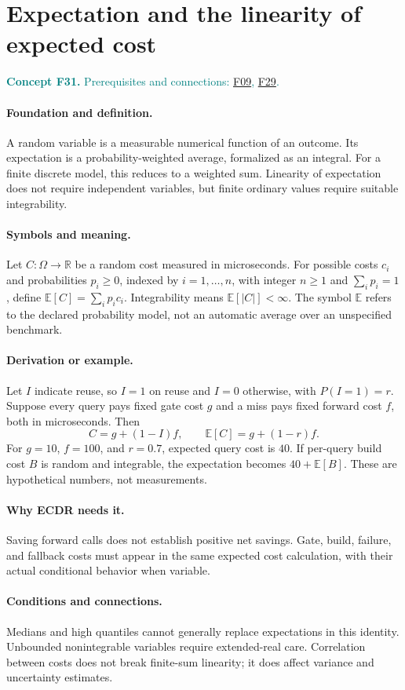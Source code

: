 \documentclass[11pt,a4paper]{article}
\newcommand{\R}{\mathbb R}
\newcommand{\E}{\mathbb E}
\newcommand{\conceptid}{Front matter}
\newcommand{\concept}[3]{\clearpage\renewcommand{\conceptid}{#1}%
\section{#2}\label{concept:#1}%
\textcolor{teal}{\textbf{Concept #1.} Prerequisites and connections: #3.}\par
\typeout{ECDR-CONCEPT-START #1 PAGE=\thepage}}
\begin{document}
\concept{F31}{Expectation and the linearity of expected cost}{\hyperref[concept:F09]{F09}, \hyperref[concept:F29]{F29}}
\paragraph{Foundation and definition.}
A random variable is a measurable numerical function of an outcome.
Its expectation is a probability-weighted average, formalized as an
integral. For a finite discrete model, this reduces to a weighted sum.
Linearity of expectation does not require independent variables, but
finite ordinary values require suitable integrability.
\paragraph{Symbols and meaning.}
Let $C:\Omega\to\R$ be a random cost measured in microseconds.
For possible costs $c_i$ and probabilities $p_i\ge0$, indexed by
$i=1,\ldots,n$, with integer $n\ge1$ and $\sum_i p_i=1$, define
$\E[C]=\sum_i p_i c_i$. Integrability means
$\E[|C|]<\infty$. The symbol $\E$ refers to the declared probability
model, not an automatic average over an unspecified benchmark.
\paragraph{Derivation or example.}
Let $I$ indicate reuse, so $I=1$ on reuse and $I=0$ otherwise, with
$P(I=1)=r$. Suppose every query pays fixed gate cost $g$ and a miss
pays fixed forward cost $f$, both in microseconds. Then
\[
 C=g+(1-I)f,\qquad \E[C]=g+(1-r)f.
\]
For $g=10$, $f=100$, and $r=0.7$, expected query cost is $40$.
If per-query build cost $B$ is random and integrable, the expectation
becomes $40+\E[B]$. These are hypothetical numbers, not measurements.
\paragraph{Why ECDR needs it.}
Saving forward calls does not establish positive net savings. Gate,
build, failure, and fallback costs must appear in the same expected
cost calculation, with their actual conditional behavior when variable.
\paragraph{Conditions and connections.}
Medians and high quantiles cannot generally replace expectations in
this identity. Unbounded nonintegrable variables require extended-real
care. Correlation between costs does not break finite-sum linearity;
it does affect variance and uncertainty estimates.
\par\label{endconcept:F31}
\end{document}
